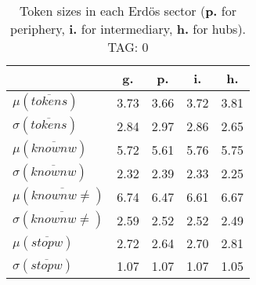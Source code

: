 \begin{table}[h!]
\begin{center}
\begin{tabular}{| l | c | c | c | c |}\hline
 & g. & p. & i. & h. \\\hline
$\mu(\overline{tokens})$ & 3.73  & 3.66  & 3.72  & 3.81 \\\hline
$\sigma(\overline{tokens})$ & 2.84  & 2.97  & 2.86  & 2.65 \\\hline
$\mu(\overline{knownw})$ & 5.72  & 5.61  & 5.76  & 5.75 \\\hline
$\sigma(\overline{knownw})$ & 2.32  & 2.39  & 2.33  & 2.25 \\\hline
$\mu(\overline{knownw \neq})$ & 6.74  & 6.47  & 6.61  & 6.67 \\\hline
$\sigma(\overline{knownw \neq})$ & 2.59  & 2.52  & 2.52  & 2.49 \\\hline
$\mu(\overline{stopw})$ & 2.72  & 2.64  & 2.70  & 2.81 \\\hline
$\sigma(\overline{stopw})$ & 1.07  & 1.07  & 1.07  & 1.05 \\\hline
\end{tabular}
\caption{Token sizes in each Erd\"os sector ({{\bf p.}} for periphery, {{\bf i.}} for intermediary, {{\bf h.}} for hubs). TAG: 0}
\end{center}
\end{table}